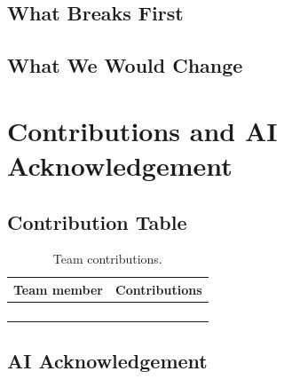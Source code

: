 \documentclass[11pt,letterpaper]{article}
\begin{document}
\subsection{What Breaks First}

\subsection{What We Would Change}

\section{Contributions and AI Acknowledgement}

\subsection{Contribution Table}

\begin{table}[htbp]
    \centering
    \caption{Team contributions.}
    \begin{tabularx}{\linewidth}{@{}lX@{}}
        \toprule
        Team member & Contributions \\
        \midrule
        & \\
        & \\
        & \\
        & \\
        \bottomrule
    \end{tabularx}
\end{table}

\subsection{AI Acknowledgement}

\end{document}
